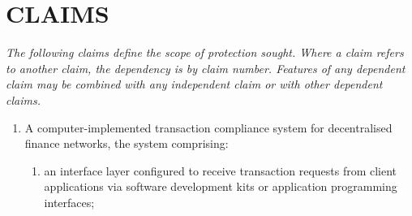 \documentclass[12pt,a4paper]{article}
\begin{document}
\section{CLAIMS}

\noindent\textit{The following claims define the scope of protection
sought. Where a claim refers to another claim, the dependency is by claim
number. Features of any dependent claim may be combined with any
independent claim or with other dependent claims.}
\vspace{0.8em}

\begin{enumerate}[label=\textbf{\arabic*.}]

\item A computer-implemented transaction compliance system for decentralised 
finance networks, the system comprising:
\begin{enumerate}[label=(\alph*)]
\item an interface layer configured to receive transaction requests from 
client applications via software development kits or application programming 
interfaces;


\end{enumerate}
\end{enumerate}
\end{document}
